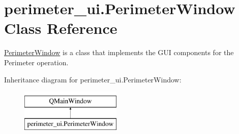 \hypertarget{classperimeter__ui_1_1_perimeter_window}{}\section{perimeter\+\_\+ui.\+Perimeter\+Window Class Reference}
\label{classperimeter__ui_1_1_perimeter_window}


\hyperlink{classperimeter__ui_1_1_perimeter_window}{Perimeter\+Window} is a class that implements the G\+UI components for the Perimeter operation.  


Inheritance diagram for perimeter\+\_\+ui.\+Perimeter\+Window\+:\begin{figure}[H]
\begin{center}
\leavevmode
\includegraphics[height=2.000000cm]{classperimeter__ui_1_1_perimeter_window}
\end{center}
\end{figure}
